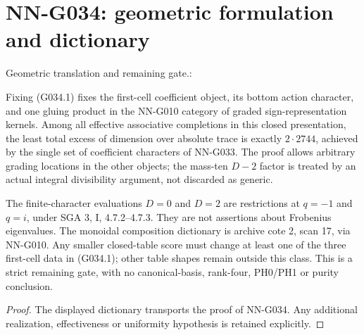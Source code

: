\section{NN-G034: geometric formulation and dictionary}
\begin{geometricstatement}[NN-G034]
Geometric translation and remaining gate.:

Fixing (G034.1) fixes the first-cell coefficient object,
its bottom action character, and one gluing product in
the NN-G010 category of graded sign-representation kernels.
Among all effective associative completions in this closed
presentation, the least total excess of dimension over
absolute trace is exactly $2\cdot2744$, achieved by the
single set of coefficient characters of NN-G033.
The proof allows arbitrary grading locations in the other
objects; the mass-ten $D-2$ factor is treated by an actual
integral divisibility argument, not discarded as generic.

The finite-character evaluations $D=0$ and $D=2$
are restrictions at $q=-1$ and $q=i$, under SGA 3,
I, 4.7.2--4.7.3. They are not assertions about Frobenius
eigenvalues. The monoidal composition dictionary is
archive cote 2, scan 17, via NN-G010.
Any smaller closed-table score must change at least one
of the three first-cell data in (G034.1); other table
shapes remain outside this class. This is a strict
remaining gate, with no canonical-basis, rank-four,
PH0/PH1 or purity conclusion.



\end{geometricstatement}
\begin{proof} The displayed dictionary transports the proof of NN-G034. Any additional realization, effectiveness or uniformity hypothesis is retained explicitly.\end{proof}


